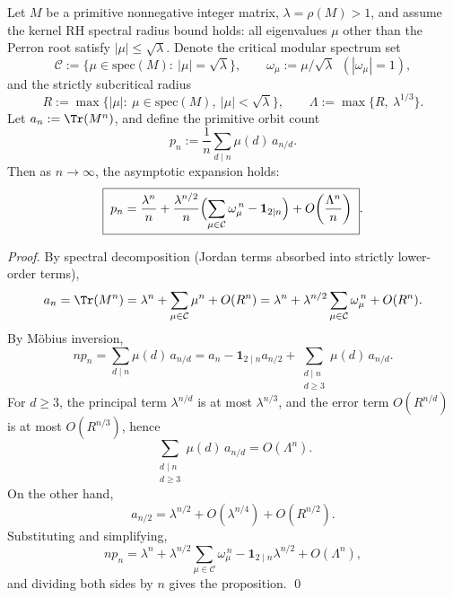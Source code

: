 \begin{proposition}[Phase resonance formula for the square-root term: critical modular spectrum and interference with the \texorpdfstring{$d=2$}{d=2} term]\label{prop:finite-rh-sqrt-resonance-general}
Let \(M\) be a primitive nonnegative integer matrix, \(\lambda=\rho(M)>1\), and assume the kernel RH spectral radius bound holds: all eigenvalues \(\mu\) other than the Perron root satisfy \(|\mu|\le \sqrt{\lambda}\).
Denote the critical modular spectrum set
\[
\mathcal{C}:=\{\mu\in\mathrm{spec}(M):\ |\mu|=\sqrt{\lambda}\},
\qquad
\omega_\mu:=\mu/\sqrt{\lambda}\ \ (|\omega_\mu|=1),
\]
and the strictly subcritical radius
\[
R:=\max\{|\mu|:\ \mu\in\mathrm{spec}(M),\ |\mu|<\sqrt{\lambda}\},
\qquad
\Lambda:=\max\{R,\ \lambda^{1/3}\}.
\]
Let \(a_n:=\Tr(M^n)\), and define the primitive orbit count
\[
p_n:=\frac{1}{n}\sum_{d\mid n}\mu(d)\,a_{n/d}.
\]
Then as \(n\to\infty\), the asymptotic expansion holds:
\[
\boxed{\;
p_n
=\frac{\lambda^n}{n}
+\frac{\lambda^{n/2}}{n}\Bigl(\sum_{\mu\in\mathcal{C}}\omega_\mu^{\,n}-\mathbf{1}_{2\mid n}\Bigr)
+O\!\left(\frac{\Lambda^n}{n}\right)\; }.
\]
\end{proposition}
\begin{proof}
By spectral decomposition (Jordan terms absorbed into strictly lower-order terms),
\[
a_n=\Tr(M^n)=\lambda^n+\sum_{\mu\in\mathcal{C}}\mu^n+O(R^n)
=\lambda^n+\lambda^{n/2}\sum_{\mu\in\mathcal{C}}\omega_\mu^{\,n}+O(R^n).
\]
By M\"obius inversion,
\[
np_n=\sum_{d\mid n}\mu(d)\,a_{n/d}
=a_n-\mathbf{1}_{2\mid n}a_{n/2}+\sum_{\substack{d\mid n\\ d\ge 3}}\mu(d)\,a_{n/d}.
\]
For \(d\ge 3\), the principal term \(\lambda^{n/d}\) is at most \(\lambda^{n/3}\), and the error term \(O(R^{n/d})\) is at most \(O(R^{n/3})\), hence
\[
\sum_{\substack{d\mid n\\ d\ge 3}}\mu(d)\,a_{n/d}=O(\Lambda^n).
\]
On the other hand,
\[
a_{n/2}=\lambda^{n/2}+O(\lambda^{n/4})+O(R^{n/2}).
\]
Substituting and simplifying,
\[
np_n=\lambda^n+\lambda^{n/2}\sum_{\mu\in\mathcal{C}}\omega_\mu^{\,n}-\mathbf{1}_{2\mid n}\lambda^{n/2}+O(\Lambda^n),
\]
and dividing both sides by \(n\) gives the proposition. \qed
\end{proof}








